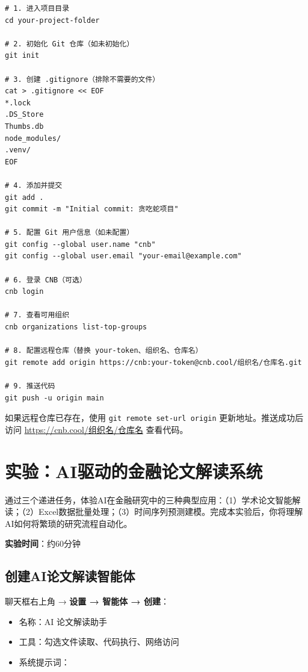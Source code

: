 \begin{lstlisting}[style=shell]
# 1. 进入项目目录
cd your-project-folder

# 2. 初始化 Git 仓库（如未初始化）
git init

# 3. 创建 .gitignore（排除不需要的文件）
cat > .gitignore << EOF
*.lock
.DS_Store
Thumbs.db
node_modules/
.venv/
EOF

# 4. 添加并提交
git add .
git commit -m "Initial commit: 贪吃蛇项目"

# 5. 配置 Git 用户信息（如未配置）
git config --global user.name "cnb"
git config --global user.email "your-email@example.com"

# 6. 登录 CNB（可选）
cnb login

# 7. 查看可用组织
cnb organizations list-top-groups

# 8. 配置远程仓库（替换 your-token、组织名、仓库名）
git remote add origin https://cnb:your-token@cnb.cool/组织名/仓库名.git

# 9. 推送代码
git push -u origin main
\end{lstlisting}

\begin{notebox}[CNB 提示]
如果远程仓库已存在，使用 \texttt{git remote set-url origin} 更新地址。推送成功后访问 \url{https://cnb.cool/组织名/仓库名} 查看代码。
\end{notebox}

\section{实验：AI驱动的金融论文解读系统}

\begin{exercisebox}[实验目标]
通过三个递进任务，体验AI在金融研究中的三种典型应用：（1）学术论文智能解读；（2）Excel数据批量处理；（3）时间序列预测建模。完成本实验后，你将理解AI如何将繁琐的研究流程自动化。
\end{exercisebox}

\textbf{实验时间}：约60分钟

\subsection{创建AI论文解读智能体}

聊天框右上角 → \textbf{设置 → 智能体 → 创建}：

\begin{itemize}[leftmargin=2em]
  \item 名称：AI 论文解读助手
  \item 工具：勾选文件读取、代码执行、网络访问
  \item 系统提示词：
\end{itemize}


